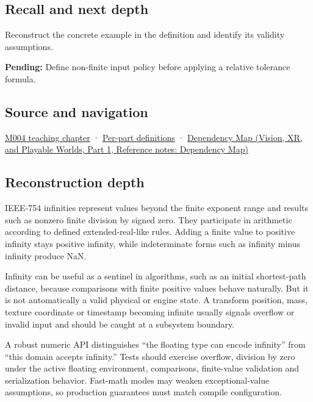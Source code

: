 \subsection{Recall and next depth}\label{appendix-eb336149c00a-recall-and-next-depth}

\hypertarget{appendix-eb336149c00a-recall-and-next-depth}{}

Reconstruct the concrete example in the definition and identify its validity assumptions.

\textbf{Pending:} Define non-finite input policy before applying a relative tolerance formula.

\subsection{Source and navigation}\label{appendix-eb336149c00a-source-and-navigation}

\hypertarget{appendix-eb336149c00a-source-and-navigation}{}

\hyperref[01-foundations-i-ch001-a-stretching-ruler-for-real-valued-quantities]{M004 teaching chapter} · \hyperref[appendix-fd090d982a15-m004---parts-61-76]{Per-part definitions} · \href{../07-Vision-XR-and-Playable-Worlds-P01/main.pdf\#nameddest=appendix-4ad47bdd269a}{Dependency Map (Vision, XR, and Playable Worlds, Part 1, Reference notes: Dependency Map)}

\subsection{Reconstruction depth}\label{appendix-eb336149c00a-reconstruction-depth}

\hypertarget{appendix-eb336149c00a-reconstruction-depth}{}

IEEE-754 infinities represent values beyond the finite exponent range and results such as nonzero finite division by signed zero. They participate in arithmetic according to defined extended-real-like rules. Adding a finite value to positive infinity stays positive infinity, while indeterminate forms such as infinity minus infinity produce NaN.

Infinity can be useful as a sentinel in algorithms, such as an initial shortest-path distance, because comparisons with finite positive values behave naturally. But it is not automatically a valid physical or engine state. A transform position, mass, texture coordinate or timestamp becoming infinite usually signals overflow or invalid input and should be caught at a subsystem boundary.

A robust numeric API distinguishes ``the floating type can encode infinity'' from ``this domain accepts infinity.'' Tests should exercise overflow, division by zero under the active floating environment, comparisons, finite-value validation and serialization behavior. Fast-math modes may weaken exceptional-value assumptions, so production guarantees must match compile configuration.
